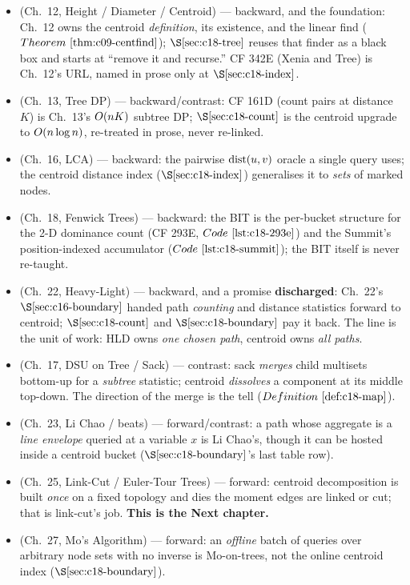 
\begin{itemize}[nosep, leftmargin=1.4em]
  \item {} (Ch.~12, Height / Diameter / Centroid) --- backward, and the foundation: Ch.~12
        owns the centroid \emph{definition}, its existence, and the linear find
        (\(\thmref{c09-centfind}\)); \(\secref{c18-tree}\) reuses that finder as a black box and starts
        at ``remove it and recurse.'' CF 342E (Xenia and Tree) is Ch.~12's URL, named in prose only at
        \(\secref{c18-index}\).
  \item {} (Ch.~13, Tree DP) --- backward/contrast: CF 161D (count pairs at distance \(K\))
        is Ch.~13's \(O(nK)\) subtree DP; \(\secref{c18-count}\) is the centroid upgrade to
        \(O(n\log n)\), re-treated in prose, never re-linked.
  \item {} (Ch.~16, LCA) --- backward: the pairwise \(\operatorname{dist}(u,v)\) oracle a single query uses;
        the centroid distance index (\(\secref{c18-index}\)) generalises it to \emph{sets} of marked
        nodes.
  \item {} (Ch.~18, Fenwick Trees) --- backward: the BIT is the per-bucket structure for the
        2-D dominance count (CF 293E, \(\coderef{c18-293e}\)) and the Summit's position-indexed
        accumulator (\(\coderef{c18-summit}\)); the BIT itself is never re-taught.
  \item {} (Ch.~22, Heavy-Light) --- backward, and a promise \textbf{discharged}: Ch.~22's
        \(\secref{c16-boundary}\) handed path \emph{counting} and distance statistics forward to
        centroid; \(\secref{c18-count}\) and \(\secref{c18-boundary}\) pay it back. The line is the
        unit of work: HLD owns \emph{one chosen path}, centroid owns \emph{all paths}.
  \item {} (Ch.~17, DSU on Tree / Sack) --- contrast: sack \emph{merges} child multisets
        bottom-up for a \emph{subtree} statistic; centroid \emph{dissolves} a component at its middle
        top-down. The direction of the merge is the tell (\(\defref{c18-map}\)).
  \item {} (Ch.~23, Li Chao / beats) --- forward/contrast: a path whose aggregate is a
        \emph{line envelope} queried at a variable \(x\) is Li Chao's, though it can be hosted inside a
        centroid bucket (\(\secref{c18-boundary}\)'s last table row).
  \item {} (Ch.~25, Link-Cut / Euler-Tour Trees) --- forward: centroid decomposition is built
        \emph{once} on a fixed topology and dies the moment edges are linked or cut; that is
        link-cut's job. \textbf{This is the Next chapter.}
  \item {} (Ch.~27, Mo's Algorithm) --- forward: an \emph{offline} batch of queries over
        arbitrary node sets with no inverse is Mo-on-trees, not the online centroid index
        (\(\secref{c18-boundary}\)).
\end{itemize}

